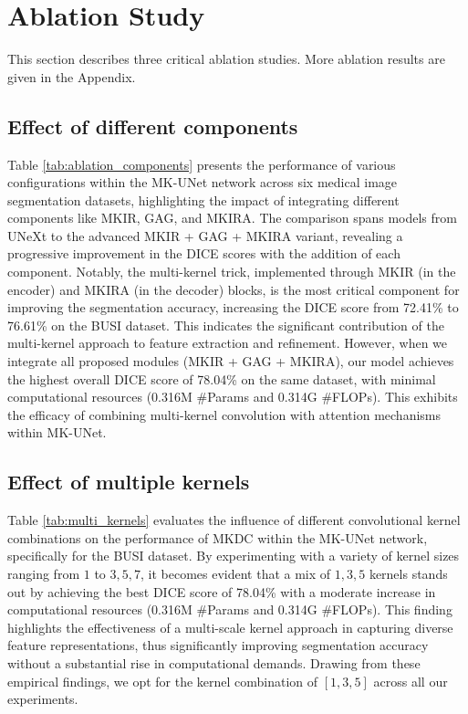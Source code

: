 
\section{Ablation Study}
\label{sec:ablation_study}
This section describes three critical ablation studies. More ablation results are given in the Appendix.
\subsection{Effect of different components}
\label{ssec:components}
Table \ref{tab:ablation_components} presents the performance of various configurations within the MK-UNet network across six medical image segmentation datasets, highlighting the impact of integrating different components like MKIR, GAG, and MKIRA. The comparison spans models from UNeXt to the advanced MKIR + GAG + MKIRA variant, revealing a progressive improvement in the DICE scores with the addition of each component. Notably, the multi-kernel trick, implemented through MKIR (in the encoder) and MKIRA (in the decoder) blocks, is the most critical component for improving the segmentation accuracy, increasing the DICE score from 72.41\% to 76.61\% on the BUSI dataset. This indicates the significant contribution of the multi-kernel approach to feature extraction and refinement. However, when we integrate all proposed modules (MKIR + GAG + MKIRA), our model achieves the highest overall DICE score of 78.04\% on the same dataset, with minimal computational resources (0.316M \#Params and 0.314G \#FLOPs). This exhibits the efficacy of combining multi-kernel convolution with attention mechanisms within MK-UNet.%


\subsection{Effect of multiple kernels}
\label{ssec:multiple_kernels}
Table \ref{tab:multi_kernels} evaluates the influence of different convolutional kernel combinations on the performance of MKDC within the MK-UNet network, specifically for the BUSI dataset. By experimenting with a variety of kernel sizes ranging from $1$ to $3,5,7$, it becomes evident that a mix of $1,3,5$ kernels stands out by achieving the best DICE score of 78.04\% with a moderate increase in computational resources (0.316M \#Params and 0.314G \#FLOPs). This finding highlights the effectiveness of a multi-scale kernel approach in capturing diverse feature representations, thus significantly improving segmentation accuracy without a substantial rise in computational demands. Drawing from these empirical findings, we opt for the kernel combination of $[1,3,5]$ across all our experiments.


